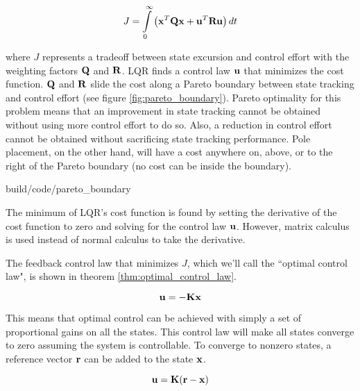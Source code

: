 \begin{equation*}
  J = \int\limits_0^\infty \left(\mathbf{x}^T\mathbf{Q}\mathbf{x} +
    \mathbf{u}^T\mathbf{R}\mathbf{u}\right) dt
\end{equation*}

where $J$ represents a tradeoff between \gls{state} excursion and control effort
with the weighting factors $\mathbf{Q}$ and $\mathbf{R}$. LQR finds a control law
$\mathbf{u}$ that minimizes the cost function. $\mathbf{Q}$ and $\mathbf{R}$ slide the
cost along a Pareto boundary between state tracking and control effort (see
figure \ref{fig:pareto_boundary}). Pareto optimality for this problem means that
an improvement in state tracking cannot be obtained without using more control
effort to do so. Also, a reduction in control effort cannot be obtained without
sacrificing state tracking performance. Pole placement, on the other hand, will
have a cost anywhere on, above, or to the right of the Pareto boundary (no cost
can be inside the boundary).

\begin{svg}{build/code/pareto_boundary}
  \caption{Pareto boundary for LQR}
  \label{fig:pareto_boundary}
\end{svg}

The minimum of LQR's cost function is found by setting the derivative of the
cost function to zero and solving for the control law $\mathbf{u}$. However, matrix
calculus is used instead of normal calculus to take the derivative.

The feedback \gls{control law} that minimizes $J$, which we'll call the
``optimal control law", is shown in theorem \ref{thm:optimal_control_law}.

\begin{theorem}
  \label{thm:optimal_control_law}

  \begin{equation}
    \mathbf{u} = -\mathbf{K}\mathbf{x}
  \end{equation}
\end{theorem}

This means that optimal control can be achieved with simply a set of
proportional gains on all the states. This \gls{control law} will make all
states converge to zero assuming the system is controllable. To converge to
nonzero states, a reference vector $\mathbf{r}$ can be added to the state
$\mathbf{x}$.

\begin{theorem}
  \begin{equation}
    \mathbf{u} = \mathbf{K}(\mathbf{r} - \mathbf{x})
  \end{equation}
\end{theorem}

